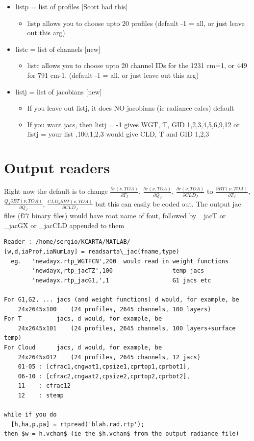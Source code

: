 \documentclass[11pt]{article}
\begin{document}
\begin{itemize}
\item   listp = list of profiles [Scott had this]
  \begin{itemize}
  \item listp allows you to choose upto 20 profiles (default -1 = all, or just
  leave out this arg)
  \end{itemize}  
\item   listc = list of channels [new]
  \begin{itemize}
  \item listc allows you to choose upto 20 channel IDs  for the 1231
  cm=1, or 449 for 791 cm-1. (default -1 = all, or just leave out this arg)
  \end{itemize}
\item   listj = list of jacobians [new]
  \begin{itemize}
  \item If you leave out listj, it does NO jacobians (ie radiance calcs) default

  \item If you want jacs, then listj = -1 gives WGT, T, GID 1,2,3,4,5,6,9,12
                                or listj = your list ,100,1,2,3    would give CLD, T and GID 1,2,3
  \end{itemize}
\end{itemize}

\section{Output readers}
Right now the default is to change $\frac{\partial
  r(\nu,TOA)}{\partial T_J}$, $\frac{\partial r(\nu,TOA)}{\partial
  Q_J}$, $\frac{\partial r(\nu,TOA)}{\partial CLD_J}$ to
$\frac{\partial BT(\nu,TOA)}{\partial T_J}$, $\frac{Q_J \partial
  BT(\nu,TOA)}{\partial Q_J}$, $\frac{CLD_J \partial
  BT(\nu,TOA)}{\partial CLD_J}$ but this can easily be coded out. The
output jac files (f77 binary files) would have root name of fout,
followed by \_jacT or \_jacGX or \_jacCLD appended to them

\begin{verbatim}
Reader : /home/sergio/KCARTA/MATLAB/
[w,d,iaProf,iaNumLay] = readsarta\_jac(fname,type)
  eg.   'newdayx.rtp_WGTFCN',200  would read in weight functions
        'newdayx,rtp_jacTZ',100                 temp jacs 
        'newdayx.rtp_jacG1,',1                  G1 jacs etc

For G1,G2, ... jacs (and weight functions) d would, for example, be
    24x2645x100    (24 profiles, 2645 channels, 100 layers)
For T          jacs, d would, for example, be
    24x2645x101    (24 profiles, 2645 channels, 100 layers+surface temp)
For Cloud      jacs, d would, for example, be
    24x2645x012    (24 profiles, 2645 channels, 12 jacs)
    01-05 : [cfrac1,cngwat1,cpsize1,cprtop1,cprbot1],
    06-10 : [cfrac2,cngwat2,cpsize2,cprtop2,cprbot2],
    11    : cfrac12
    12    : stemp 

while if you do
  [h,ha,p,pa] = rtpread('blah.rad.rtp');
then $w = h.vchan$ (ie the $h.vchan$ from the output radiance file)
\end{verbatim} 
\end{document}
